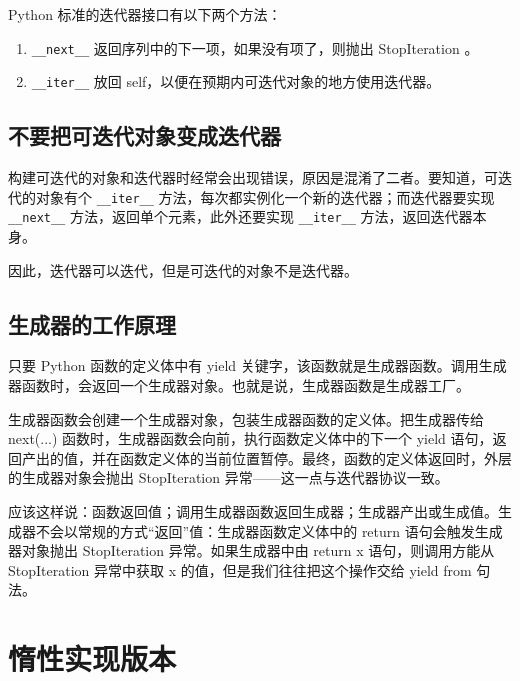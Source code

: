 Python 标准的迭代器接口有以下两个方法：
\begin{enumerate}
    \item \verb|__next__| 返回序列中的下一项，如果没有项了，则抛出 StopIteration 。
    \item \verb|__iter__| 放回 self，以便在预期内可迭代对象的地方使用迭代器。
\end{enumerate}

\subsection{不要把可迭代对象变成迭代器}
构建可迭代的对象和迭代器时经常会出现错误，原因是混淆了二者。要知道，可迭代的对象有个 \verb|__iter__| 方法，每次都实例化一个新的迭代器；而迭代器要实现 \verb|__next__| 方法，返回单个元素，此外还要实现 \verb|__iter__| 方法，返回迭代器本身。

因此，迭代器可以迭代，但是可迭代的对象不是迭代器。

\subsection{生成器的工作原理}
只要 Python 函数的定义体中有 yield 关键字，该函数就是生成器函数。调用生成器函数时，会返回一个生成器对象。也就是说，生成器函数是生成器工厂。

生成器函数会创建一个生成器对象，包装生成器函数的定义体。把生成器传给 next(...) 函数时，生成器函数会向前，执行函数定义体中的下一个 yield 语句，返回产出的值，并在函数定义体的当前位置暂停。最终，函数的定义体返回时，外层的生成器对象会抛出 StopIteration 异常——这一点与迭代器协议一致。


应该这样说：函数返回值；调用生成器函数返回生成器；生成器产出或生成值。生成器不会以常规的方式“返回”值：生成器函数定义体中的 return 语句会触发生成器对象抛出 StopIteration 异常。如果生成器中由 return x 语句，则调用方能从 StopIteration 异常中获取 x 的值，但是我们往往把这个操作交给 yield from 句法。
\section{惰性实现版本}

